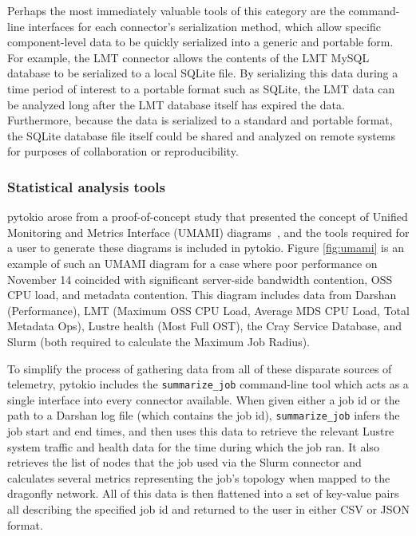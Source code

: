 Perhaps the most immediately valuable tools of this category are the command-line interfaces for each connector's serialization method, which allow specific component-level data to be quickly serialized into a generic and portable form.
For example, the LMT connector allows the contents of the LMT MySQL database to be serialized to a local SQLite file.
By serializing this data during a time period of interest to a portable format such as SQLite, the LMT data can be analyzed long after the LMT database itself has expired the data.
Furthermore, because the data is serialized to a standard and portable format, the SQLite database file itself could be shared and analyzed on remote systems for purposes of collaboration or reproducibility.

\subsubsection{Statistical analysis tools}

pytokio arose from a proof-of-concept study that presented the concept of Unified Monitoring and Metrics Interface (UMAMI) diagrams~\cite{Lockwood2017}, and the tools required for a user to generate these diagrams is included in pytokio.
Figure \ref{fig:umami} is an example of such an UMAMI diagram for a case where poor performance on November 14 coincided with significant server-side bandwidth contention, OSS CPU load, and metadata contention.
This diagram includes data from Darshan (Performance), LMT (Maximum OSS CPU Load, Average MDS CPU Load, Total Metadata Ops), Lustre health (Most Full OST), the Cray Service Database, and Slurm (both required to calculate the Maximum Job Radius).

To simplify the process of gathering data from all of these disparate sources of telemetry, pytokio includes the \texttt{summarize\_job} command-line tool which acts as a single interface into every connector available.
When given either a job id or the path to a Darshan log file (which contains the job id), \texttt{summarize\_job} infers the job start and end times, and then uses this data to retrieve the relevant Lustre system traffic and health data for the time during which the job ran.
It also retrieves the list of nodes that the job used via the Slurm connector and calculates several metrics representing the job's topology when mapped to the dragonfly network.
All of this data is then flattened into a set of key-value pairs all describing the specified job id and returned to the user in either CSV or JSON format.



